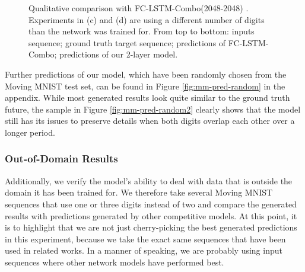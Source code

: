\begin{figure}[h!tb]
\begin{subfigure}{0.49\textwidth}
  \caption{}
  \label{fig:mm-pred-spec-lstm4}
\end{subfigure}
\caption[Comparison with LSTM on Moving MNIST]{Qualitative comparison with FC-LSTM-Combo(2048-2048) \parencite{unsup_learn_lstm}. Experiments in (c) and (d) are using a different number of digits than the network was trained for. From top to bottom: inputs sequence; ground truth target sequence; predictions of FC-LSTM-Combo; predictions of our 2-layer model.} \label{fig:mm-pred-spec-lstm}
\end{figure}

Further predictions of our model, which have been randomly chosen from the Moving MNIST test set, can be found in Figure \ref{fig:mm-pred-random} in the appendix. While most generated results look quite similar to the ground truth future, the sample in Figure \ref{fig:mm-pred-random2} clearly shows that the model still has its issues to preserve details when both digits overlap each other over a longer period.


\subsubsection{Out-of-Domain Results}

Additionally, we verify the model's ability to deal with data that is outside the domain it has been trained for. We therefore take several Moving MNIST sequences that use one or three digits instead of two and compare the generated results with predictions generated by other competitive models. At this point, it is to highlight that we are not just cherry-picking the best generated predictions in this experiment, because we take the exact same sequences that have been used in related works. In a manner of speaking, we are probably using input sequences where other network models have performed best.

